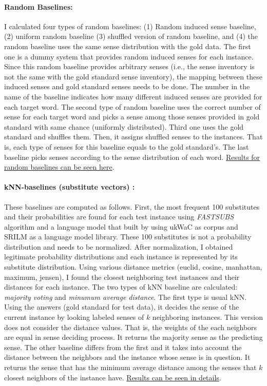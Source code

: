 \paragraph{Random Baselines:}I calculated four types of random baselines: (1) Random induced sense baseline, (2) uniform random baseline (3) shuffled version of random baseline, and (4) the random baseline uses the same sense distribution with the gold data. The first one is a dummy system that provides random induced senses for each instance. Since this random baseline provides arbitrary senses (i.e., the sense inventory is not the same with the gold standard sense inventory), the mapping between these induced senses and gold standard senses needs to be done. The number in the name of the baseline indicates how many different induced senses are provided for each target word. The second type of random baseline uses the correct number of sense for each target word and picks a sense among those senses provided in gold standard with same chance (uniformly distributed). Third one uses the gold standard and shuffles them. Then, it assigns shuffled senses to the instances. That is, each type of  senses for this baseline equals to the gold standard's. The last baseline picks senses according to the sense distribution of each word. \href{http://goo.gl/f2X0da}{Results for random baselines can be seen here}.
\paragraph{kNN-baselines (substitute vectors) :} These baselines are computed as follows. First, the most frequent 100 substitutes and their probabilities are found for each test instance using \emph{FASTSUBS} algorithm \cite{fastsubs} and a language model that built by using ukWaC \cite{ukWaC} as corpus and SRILM \cite{stolcke02srilm} as a language model library. These 100 substitutes is not a probability distribution and needs to be normalized. After normalization, I obtained legitimate probability distributions and each instance is represented by its substitute distribution. Using various distance metrics (euclid, cosine, manhattan, maximum, jensen), I found the closest neighboring test instances and their distances for each instance. The two types of kNN baseline are calculated: \emph{majority voting} and \emph{minumum average distance}. The first type is usual kNN. Using the answers (gold standard for test data), it decides the sense of the current instance by looking labeled senses of $k$ neighboring instances. This version does not consider the distance values. That is, the weights of the each neighbors are equal in sense deciding process. It returns the majority sense as the predicting sense. The other baseline differs from the first and it takes into account the distance between the neighbors and the instance whose sense is in question. It returns the sense that has the minimum average distance among the senses that $k$ closest neighbors of the instance have. \href{http://goo.gl/ofm4cW}{Results can be seen in details}.
